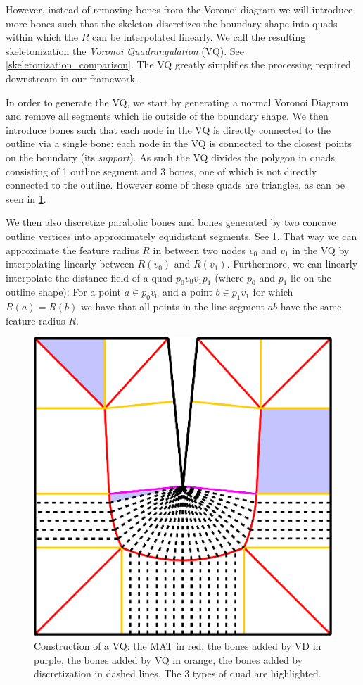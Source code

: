 However, instead of removing bones from the Voronoi diagram we will introduce more bones such that the skeleton discretizes the boundary shape into quads within which the $R$ can be interpolated linearly.
We call the resulting skeletonization the \emph{Voronoi Quadrangulation} (VQ).
See \cref{skeletonization_comparison}.
The VQ greatly simplifies the processing required downstream in our framework.

In order to generate the VQ, we start by generating a normal Voronoi Diagram and remove all segments which lie outside of the boundary shape.
We then introduce bones such that each node in the VQ is directly connected to the outline via a single bone:
each node in the VQ is connected to the closest points on the boundary (its \emph{support}).
As such the VQ divides the polygon in quads consisting of 1 outline segment and 3 bones, one of which is not directly connected to the outline.
However some of these quads are triangles, as can be seen in \cref{discretization}.

We then also discretize parabolic bones and bones generated by two concave outline vertices into approximately equidistant segments.
See \cref{discretization}.
That way we can approximate the feature radius $R$ in between two nodes $v_0$ and $v_1$ in the VQ by interpolating linearly between $R(v_0)$ and $R(v_1)$.
Furthermore, we can linearly interpolate the distance field of a quad $p_0v_0v_1p_1$ (where $p_0$ and $p_1$ lie on the outline shape):
For a point $a \in p_0v_0$ and a point $b \in p_1v_1$ for which $R(a) = R(b)$ we have that all points in the line segment $ab$ have the same feature radius $R$.

\begin{figure}
\centering
\includegraphics[width=.5\columnwidth]{sources/method/parabola_dip.pdf}
\caption{
Construction of a VQ:
the MAT in red,
the bones added by VD in purple,
the bones added by VQ in orange,
the bones added by discretization in dashed lines.
The 3 types of quad are highlighted.
}
\label{discretization}
\end{figure}



